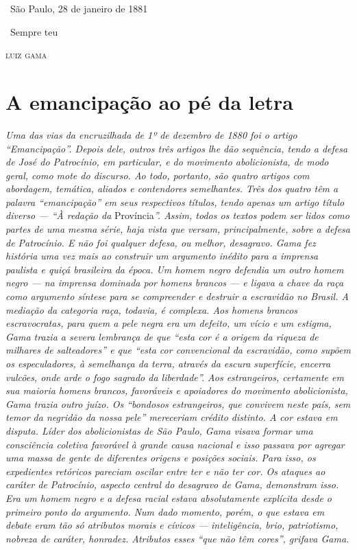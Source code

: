 {\medskip

\hfill\ São Paulo, 28 de janeiro de 1881

\hfill\ Sempre teu

\hfill\textsc{luiz gama}

\part{A emancipação ao pé da letra}

\begin{didas}
\emph{Uma das vias da encruzilhada de 1º de dezembro de 1880 foi o
artigo ``Emancipação''. Depois dele, outros três artigos lhe dão
sequência, tendo a defesa de José do Patrocínio, em particular, e do
movimento abolicionista, de modo geral, como mote do discurso. Ao todo,
portanto, são quatro artigos com abordagem, temática, aliados e
contendores semelhantes. Três dos quatro têm a palavra ``emancipação'' em
seus respectivos títulos, tendo apenas um artigo título diverso --- ``À redação da}
Província\emph{''. Assim, todos os textos podem ser lidos como partes de uma mesma
série, haja vista que versam, principalmente, sobre a defesa de
Patrocínio. E não foi qualquer defesa, ou melhor, desagravo. Gama fez
história uma vez mais ao construir um argumento inédito para a imprensa
paulista e quiçá brasileira da época. Um homem negro defendia um outro
homem negro --- na imprensa dominada por homens brancos --- e ligava a
chave da raça como argumento síntese para se compreender e destruir a
escravidão no Brasil. A mediação da categoria raça, todavia, é complexa.
Aos homens brancos escravocratas, para quem a pele negra era um defeito,
um vício e um estigma, Gama trazia a severa lembrança de que ``esta cor é
a origem da riqueza de milhares de salteadores'' e que ``esta cor
convencional da escravidão, como supõem os especuladores, à semelhança
da terra, através da escura superfície, encerra vulcões, onde arde o
fogo sagrado da liberdade''. Aos estrangeiros, certamente em sua maioria
homens brancos, favoráveis e apoiadores do movimento abolicionista, Gama
trazia outro juízo. Os ``bondosos estrangeiros, que convivem neste país,
sem temor da negridão da nossa pele'' mereceriam crédito distinto. A cor
estava em disputa. Líder dos abolicionistas de São Paulo, Gama visava
formar uma consciência coletiva favorável à grande causa nacional e isso
passava por agregar uma massa de gente de diferentes origens e posições
sociais. Para isso, os expedientes retóricos pareciam oscilar entre ter
e não ter cor. Os ataques ao caráter de Patrocínio, aspecto central do
desagravo de Gama, demonstram isso. Era um homem negro e a defesa racial
estava absolutamente explícita desde o primeiro ponto do argumento. Num
dado momento, porém, o que estava em debate eram tão só atributos morais
e cívicos --- inteligência, brio, patriotismo, nobreza de caráter,
honradez. Atributos esses ``que não têm cores'', grifava Gama.}
\end{didas}

}
